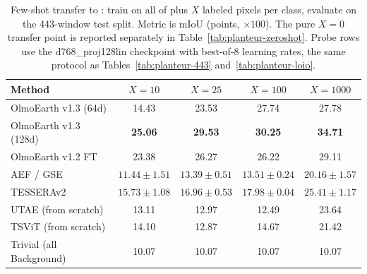 \begin{table}[t]
    \centering
    \small
    \setlength{\tabcolsep}{4pt}
    \begin{tabular}{l|cccc}
        Method & $X=10$ & $X=25$ & $X=100$ & $X=1000$\\
        \hline
        OlmoEarth v1.3 (64d) & 14.43 & 23.53 & 27.74 & 27.78\\
        OlmoEarth v1.3 (128d) & \cellcolor{colorone!25}\textbf{25.06} & \cellcolor{colorone!25}\textbf{29.53} & \cellcolor{colorone!25}\textbf{30.25} & \cellcolor{colorone!25}\textbf{34.71}\\
        OlmoEarth v1.2 FT & 23.38 & 26.27 & 26.22 & 29.11\\
        AEF / GSE & $11.44\pm1.51$ & $13.39\pm0.51$ & $13.51\pm0.24$ & $20.16\pm1.57$\\
        TESSERAv2 & $15.73\pm1.08$ & $16.96\pm0.53$ & $17.98\pm0.04$ & $25.41\pm1.17$\\
        \hline
        UTAE (from scratch) & 13.11 & 12.97 & 12.49 & 23.64\\
        TSViT (from scratch) & 14.10 & 12.87 & 14.67 & 21.42\\
        \hline
        Trivial (all Background) & 10.07 & 10.07 & 10.07 & 10.07\\
    \end{tabular}
    \caption{Few-shot transfer to \planteur: train on all of \pastis plus $X$
    labeled pixels per \planteur class, evaluate on the 443-window test split.
    Metric is mIoU (points, $\times 100$). The pure $X=0$ transfer point is
    reported separately in Table~\ref{tab:planteur-zeroshot}. Probe rows use the
    d768\_proj128lin checkpoint with best-of-8 learning rates, the same protocol
    as Tables~\ref{tab:planteur-443} and~\ref{tab:planteur-loio}.}

    \label{tab:planteur-fewshot}
\end{table}

